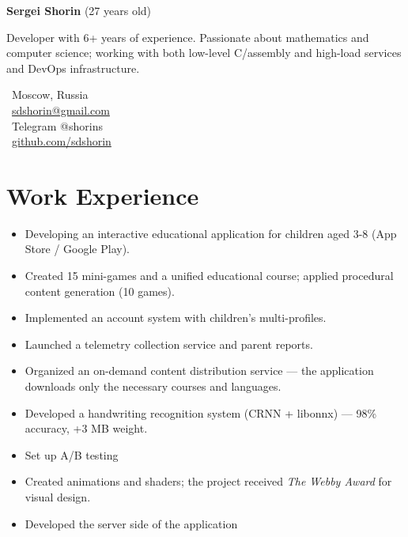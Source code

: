 \documentclass{dodiresume}
\begin{document}
\begin{minipage}{0.7\textwidth}
\begin{flushleft}
\LARGE \textbf{\textcolor{namecolor}{Sergei Shorin}} \normalsize{(27 years old)}

\vspace{0.3cm}
Developer with 6+ years of experience. Passionate about mathematics and computer science; working with both low-level C/assembly and high-load services and DevOps infrastructure.
\end{flushleft}
\end{minipage}
\begin{minipage}{0.28\textwidth}
\begin{flushright}
\faMapMarker\ Moscow, Russia \\
\faEnvelope\ \href{mailto:sdshorin@gmail.com}{sdshorin@gmail.com} \\
\faPaperPlane\ Telegram @shorins \\
\faGithub\ \href{https://github.com/sdshorin}{github.com/sdshorin}
\end{flushright}
\end{minipage}

\vspace{0.1cm}

\section{Work Experience}


\begin{itemize}
\item Developing an interactive educational application for children aged 3-8 (App Store / Google Play).
\item Created 15 mini-games and a unified educational course; applied procedural content generation (10 games).
\item Implemented an account system with children's multi-profiles.
\item Launched a telemetry collection service and parent reports.
\item Organized an on-demand content distribution service — the application downloads only the necessary courses and languages.
\item Developed a handwriting recognition system (CRNN + libonnx) — 98\% accuracy, +3 MB weight.
\item Set up A/B testing
\item Created animations and shaders; the project received \textit{The Webby Award} for visual design.
\item Developed the server side of the application
\end{itemize}
\end{document}
